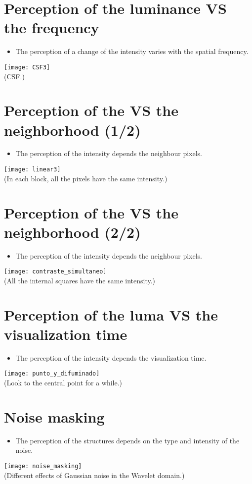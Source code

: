 \section{Perception of the luminance VS the frequency}
\begin{itemize}
\item The perception of a change of the intensity varies with the spatial frequency.
\end{itemize}
\begin{center}
  \texttt{[image: CSF3]}\\
  (\gls{CSF}.)
\end{center}

\section{Perception of the  VS the neighborhood (1/2)}
\begin{itemize}
\item The perception of the intensity depends the neighbour pixels.
\end{itemize}
\begin{center}
  \texttt{[image: linear3]}\\
  (In each block, all the pixels have the same intensity.)
\end{center}

\section{Perception of the  VS the neighborhood (2/2)}
\begin{itemize}
\item The perception of the intensity depends the neighbour pixels.
\end{itemize}
\begin{center}
  \texttt{[image: contraste\_simultaneo]}\\
  (All the internal squares have the same intensity.)
\end{center}

\section{Perception of the luma VS the visualization time}
\begin{itemize}
\item The perception of the intensity depends the visualization time.
\end{itemize}
\begin{center}
  \texttt{[image: punto\_y\_difuminado]}\\
  (Look to the central point for a while.)
\end{center}

\section{Noise masking}
\begin{itemize}
\item The perception of the structures depends on the type and intensity of the noise.
\end{itemize}
\begin{center}
  \texttt{[image: noise\_masking]}\\
  (Different effects of Gaussian noise in the Wavelet domain.)
\end{center}
